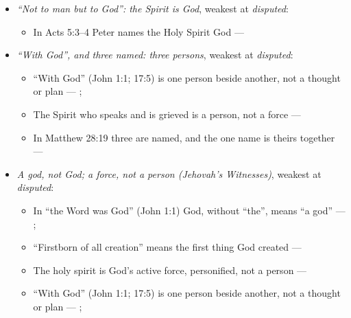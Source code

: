 \documentclass[11pt,paper=\testimonypaper,DIV=13,parskip=false]{scrartcl}
\begin{document}
\begin{itemize}
\begin{itemize}
\item By John 1:3 the Word is not among the things made --- \cite[Tractates on John I.11]{schaff-nicene-post-nicene-fathers-1-7}
\item an inference step --- \cite[3, The Triune God]{kibbey-living-systematic-theology-2026}; \cite[ch. 4, Conclusion]{bernard-oneness-of-god-1983}; \cite[17--19]{buzzard-caveat-lector-2001}
\end{itemize}
\item \emph{“Not to man but to God”: the Spirit is God}, weakest at \emph{disputed}:
\begin{itemize}
\item In Acts 5:3–4 Peter names the Holy Spirit God --- \cite[198]{calvin-commentary-acts-1844}
\end{itemize}
\item \emph{“With God”, and three named: three persons}, weakest at \emph{disputed}:
\begin{itemize}
\item “With God” (John 1:1; 17:5) is one person beside another, not a thought or plan --- \cite[3, The Triune God]{kibbey-living-systematic-theology-2026}; \cite[27]{watchtower-should-you-believe-trinity-1989}
\item The Spirit who speaks and is grieved is a person, not a force --- \cite[3, The Triune God]{kibbey-living-systematic-theology-2026}
\item In Matthew 28:19 three are named, and the one name is theirs together --- \cite[3, The Triune God]{kibbey-living-systematic-theology-2026}
\end{itemize}
\item \emph{A god, not God; a force, not a person (Jehovah’s Witnesses)}, weakest at \emph{disputed}:
\begin{itemize}
\item In “the Word was God” (John 1:1) God, without “the”, means “a god” --- \cite[27]{watchtower-should-you-believe-trinity-1989}; \cite{new-world-translation-2013}
\item “Firstborn of all creation” means the first thing God created --- \cite[14]{watchtower-should-you-believe-trinity-1989}
\item The holy spirit is God’s active force, personified, not a person --- \cite[20--23]{watchtower-should-you-believe-trinity-1989}
\item “With God” (John 1:1; 17:5) is one person beside another, not a thought or plan --- \cite[3, The Triune God]{kibbey-living-systematic-theology-2026}; \cite[27]{watchtower-should-you-believe-trinity-1989}

\end{itemize}
\end{itemize}
\end{document}
